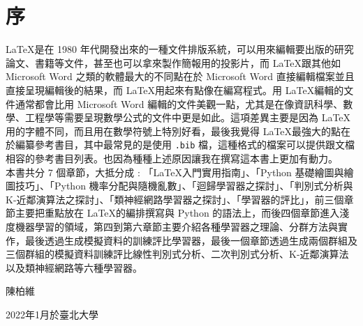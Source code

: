 \chapter*{序}

\LaTeX 是在 1980 年代開發出來的一種文件排版系統，可以用來編輯要出版的研究論文、書籍等文件，甚至也可以拿來製作簡報用的投影片，而 \LaTeX 跟其他如 Microsoft Word 之類的軟體最大的不同點在於 Microsoft Word 直接編輯檔案並且直接呈現編輯後的結果，而 \LaTeX 用起來有點像在編寫程式。用 \LaTeX 編輯的文件通常都會比用 Microsoft Word 編輯的文件美觀一點，尤其是在像資訊科學、數學、工程學等需要呈現數學公式的文件中更是如此。這項差異主要是因為 \LaTeX 用的字體不同，而且用在數學符號上特別好看，最後我覺得 \LaTeX 最強大的點在於編纂參考書目，其中最常見的是使用 \verb|.bib| 檔，這種格式的檔案可以提供跟文檔相容的參考書目列表。也因為種種上述原因讓我在撰寫這本書上更加有動力。\\

本書共分 7 個章節，大抵分成 : 「\LaTeX 入門實用指南」、「Python 基礎繪圖與繪圖技巧」、「Python 機率分配與隨機亂數」、「迴歸學習器之探討」、「判別式分析與 K-近鄰演算法之探討」、「類神經網路學習器之探討」、「學習器的評比」，前三個章節主要把重點放在 \LaTeX 的編排撰寫與 Python 的語法上，而後四個章節進入淺度機器學習的領域，第四到第六章節主要介紹各種學習器之理論、分群方法與實作，最後透過生成模擬資料的訓練評比學習器，最後一個章節透過生成兩個群組及三個群組的模擬資料訓練評比線性判別式分析、二次判別式分析、K-近鄰演算法以及類神經網路等六種學習器。

\begin{flushright}
    陳柏維
    \par\vspace*{-2pt}\hfill 2022年1月於臺北大學
\end{flushright}

